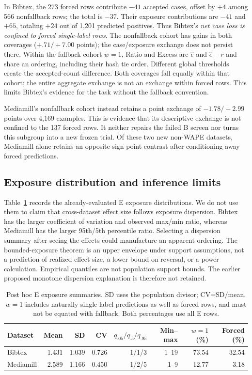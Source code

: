 In Bibtex, the 273 forced rows contribute $-41$ accepted cases, offset by $+4$ among 566 nonfallback rows; the total is $-37$. Their exposure contributions are $-41$ and $+65$, totaling $+24$ out of 1,201 predicted positives. Thus Bibtex's \emph{net case loss is confined to forced single-label rows}. The nonfallback cohort has gains in both coverages ($+.71/ +7.00$ points); the case/exposure exchange does not persist there. Within the fallback cohort $w=1$, Ratio and Excess are $\hat e$ and $\hat e-r$ and share an ordering, including their hash tie order. Different global thresholds create the accepted-count difference. Both coverages fall equally within that cohort; the entire aggregate exchange is not an exchange within forced rows. This limits Bibtex's evidence for the task without the fallback convention.

Mediamill's nonfallback cohort instead retains a point exchange of $-1.78/ +2.99$ points over 4,169 examples. This is evidence that its descriptive exchange is not confined to the 137 forced rows. It neither repairs the failed B screen nor turns this subgroup into a new frozen trial. Of these two new non-WAPE datasets, Mediamill alone retains an opposite-sign point contrast after conditioning away forced predictions.

\subsection{Exposure distribution and inference limits}
\label{sec:v13-exposure}
Table~\ref{tab:v13-exposure} records the already-evaluated E exposure distributions. We do not use them to claim that cross-dataset effect size follows exposure dispersion. Bibtex has the larger coefficient of variation and observed max/min ratio, whereas Mediamill has the larger 95th/5th percentile ratio. Selecting a dispersion summary after seeing the effects could manufacture an apparent ordering. The bounded-exposure theorem is an upper envelope under support assumptions, not a prediction of realized effect size, a lower bound on reversal, or a power calculation. Empirical quantiles are not population support bounds. The earlier proposed monotone dispersion explanation is therefore not retained.

\begin{table}[H]\centering\small
\setlength{\tabcolsep}{4pt}
\caption{Post hoc E exposure summaries. SD uses the population divisor; CV=SD/mean. $w=1$ includes naturally single-label predictions as well as forced rows, and must not be equated with fallback. Both percentages use all E rows.}
\label{tab:v13-exposure}
\begin{tabular}{lrrrrrrr}\toprule
Dataset & Mean & SD & CV & $q_{.05}/q_{.5}/q_{.95}$ & Min--max & $w=1$ (\%) & Forced (\%)\\\midrule
Bibtex & 1.431 & 1.039 & 0.726 & 1/1/3 & 1--19 & 73.54 & 32.54 \\
Mediamill & 2.589 & 1.166 & 0.450 & 1/2/5 & 1--9 & 12.77 & 3.18 \\
\bottomrule\end{tabular}
\end{table}

